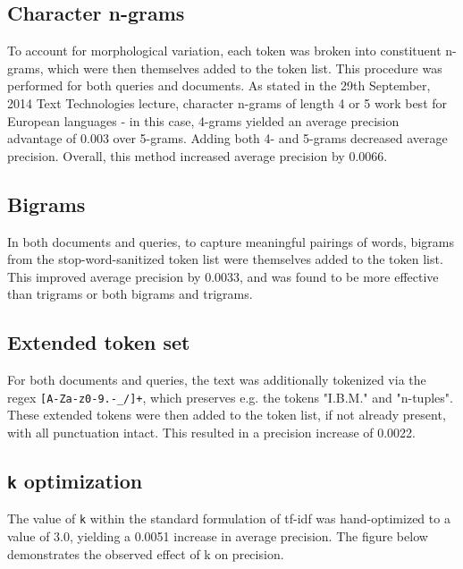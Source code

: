 \documentclass{article}
\begin{document}
\subsection{Character n-grams}
To account for morphological variation, each token was broken into constituent n-grams, which were then themselves added to the token list. This procedure was performed for both queries and documents. As stated in the 29th September, 2014 Text Technologies lecture, character n-grams of length 4 or 5 work best for European languages - in this case, 4-grams yielded an average precision advantage of 0.003 over 5-grams. Adding both 4- and 5-grams decreased average precision. Overall, this method increased average precision by 0.0066.
\subsection{Bigrams}
In both documents and queries, to capture meaningful pairings of words, bigrams from the stop-word-sanitized token list were themselves added to the token list. This improved average precision by 0.0033, and was found to be more effective than trigrams or both bigrams and trigrams.
\subsection{Extended token set}
For both documents and queries, the text was additionally tokenized via the regex \texttt{[A-Za-z0-9.-\_/]+}, which preserves e.g. the tokens "I.B.M." and "n-tuples". These extended tokens were then added to the token list, if not already present, with all punctuation intact. This resulted in a precision increase of 0.0022.
\subsection{\texttt{k} optimization}
The value of \texttt{k} within the standard formulation of tf-idf was hand-optimized to a value of 3.0, yielding a 0.0051 increase in average precision. The figure below demonstrates the observed effect of k on precision.
\end{document}
